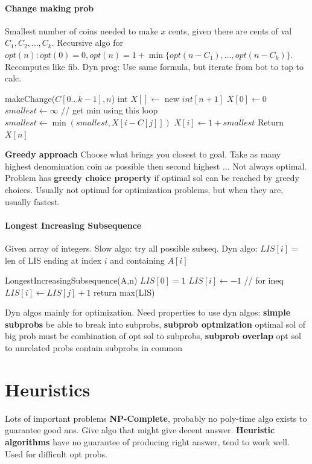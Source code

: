 \paragraph{Change making prob} Smallest number of coins needed to make $x$ cents, given there are cents of val $C_1,C_2,\ldots,C_k$. Recursive algo for $opt(n): opt(0)=0, opt(n)=1+\min\{opt(n-C_1),\ldots,opt(n-C_k)\}$. Recomputes like fib. Dyn prog: Use same formula, but iterate from bot to top to calc.
\begin{algorithmic}
  \State makeChange($C[0\ldots k-1],n$)
  \State int $X[]\gets$ new $int[n+1]$
  \State $X[0]\gets0$
  \State $smallest\gets \infty$ // get min using this loop
  \State $smallest \gets \min(smallest,X[i-C[j]])$
  \EndIf
  \State $X[i]\gets 1+smallest$
  \EndFor
  \EndFor
  \State Return $X[n]$
\end{algorithmic}
\textbf{Greedy approach} Choose what brings you closest to goal. Take as many highest denomination coin as possible then second highest ... Not always optimal. Problem has \textbf{greedy choice property} if optimal sol can be reached by greedy choices. Usually not optimal for optimization problems, but when they are, usually fastest.
\vspace{-7 pt}
\paragraph{Longest Increasing Subsequence} Given array of integers. Slow algo: try all possible subseq. Dyn algo: $LIS[i]=$len of LIS ending at index $i$ and containing $A[i]$
\begin{algorithmic}
  \State LongestIncreasingSubsequence(A,n)
  \State $LIS[0]=1$
  \State $LIS[i] \gets -1$ // for ineq
  \State $LIS[i] \gets LIS[j]+1$
  \EndIf
  \EndFor
  \EndFor
  \State return max(LIS)
\end{algorithmic}
Dyn algos mainly for optimization. Need properties to use dyn algos: \textbf{simple subprobs} be able to break into subprobs, \textbf{subprob optmization} optimal sol of big prob must be combination of opt sol to subprobs, \textbf{subprob overlap} opt sol to unrelated probs contain subprobs in common
\color{RubineRed}
\section{\textcolor{RubineRed}{Heuristics}}Lots of important problems \textbf{NP-Complete}, probably no poly-time algo exists to guarantee good ans. Give algo that might give decent answer. \textbf{Heuristic algorithms} have no guarantee of producing right answer, tend to work well. Used for difficult opt probs.
\vspace{-7 pt}

